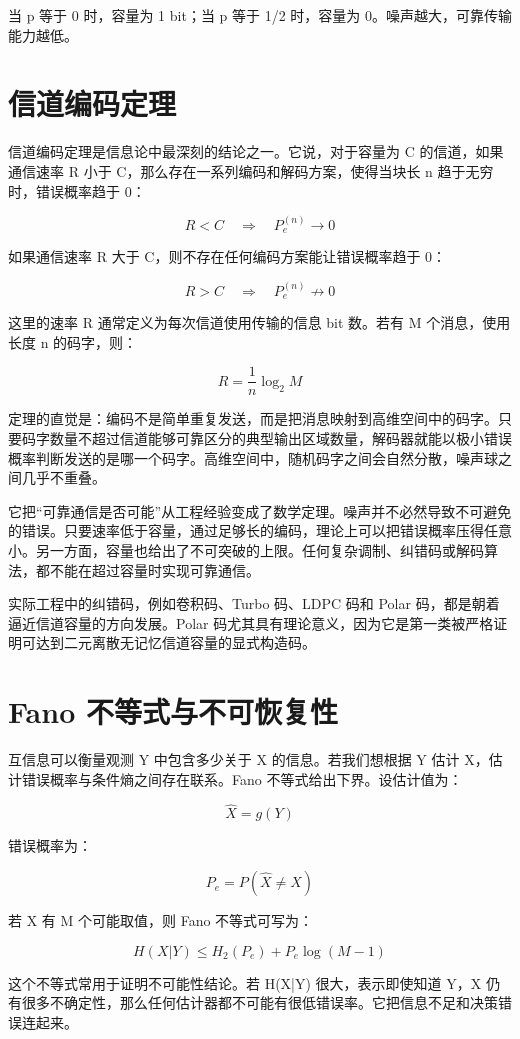 当 p 等于 0 时，容量为 1 bit；当 p 等于 1/2 时，容量为 0。噪声越大，可靠传输能力越低。

\section{信道编码定理}

信道编码定理是信息论中最深刻的结论之一。它说，对于容量为 C 的信道，如果通信速率 R 小于 C，那么存在一系列编码和解码方案，使得当块长 n 趋于无穷时，错误概率趋于 0：

\[
R<C\quad\Rightarrow\quad P_e^{(n)}\to 0
\]

如果通信速率 R 大于 C，则不存在任何编码方案能让错误概率趋于 0：

\[
R>C\quad\Rightarrow\quad P_e^{(n)}\not\to 0
\]

这里的速率 R 通常定义为每次信道使用传输的信息 bit 数。若有 M 个消息，使用长度 n 的码字，则：

\[
R=\frac{1}{n}\log_2 M
\]

定理的直觉是：编码不是简单重复发送，而是把消息映射到高维空间中的码字。只要码字数量不超过信道能够可靠区分的典型输出区域数量，解码器就能以极小错误概率判断发送的是哪一个码字。高维空间中，随机码字之间会自然分散，噪声球之间几乎不重叠。

它把“可靠通信是否可能”从工程经验变成了数学定理。噪声并不必然导致不可避免的错误。只要速率低于容量，通过足够长的编码，理论上可以把错误概率压得任意小。另一方面，容量也给出了不可突破的上限。任何复杂调制、纠错码或解码算法，都不能在超过容量时实现可靠通信。

实际工程中的纠错码，例如卷积码、Turbo 码、LDPC 码和 Polar 码，都是朝着逼近信道容量的方向发展。Polar 码尤其具有理论意义，因为它是第一类被严格证明可达到二元离散无记忆信道容量的显式构造码。

\section{Fano 不等式与不可恢复性}

互信息可以衡量观测 Y 中包含多少关于 X 的信息。若我们想根据 Y 估计 X，估计错误概率与条件熵之间存在联系。Fano 不等式给出下界。设估计值为：

\[
\hat{X}=g(Y)
\]

错误概率为：

\[
P_e=P(\hat{X}\ne X)
\]

若 X 有 M 个可能取值，则 Fano 不等式可写为：

\[
H(X|Y)\le H_2(P_e)+P_e\log(M-1)
\]

这个不等式常用于证明不可能性结论。若 H(X|Y) 很大，表示即使知道 Y，X 仍有很多不确定性，那么任何估计器都不可能有很低错误率。它把信息不足和决策错误连起来。

